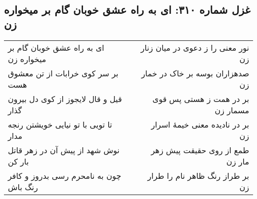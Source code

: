 \begin{center}
\section*{غزل شماره ۳۱۰: ای به راه عشق خوبان گام بر میخواره زن}
\label{sec:310}
\begin{longtable}{l p{0.5cm} r}
ای به راه عشق خوبان گام بر میخواره زن
&&
نور معنی را ز دعوی در میان زنار زن
\\
بر سر کوی خرابات از تن معشوق هست
&&
صدهزاران بوسه بر خاک در خمار زن
\\
قیل و قال لایجوز از کوی دل بیرون گذار
&&
بر در همت ز هستی پس قوی مسمار زن
\\
تا تویی با تو نیایی خویشتن رنجه مدار
&&
بر در نادیده معنی خیمهٔ اسرار زن
\\
نوش شهد از پیش آن در زهر قاتل بار کن
&&
طمع از روی حقیقت پیش زهر مار زن
\\
چون به نامحرم رسی بدروز و کافر رنگ باش
&&
بر طراز رنگ ظاهر نام را طرار زن
\\
\end{longtable}
\end{center}
